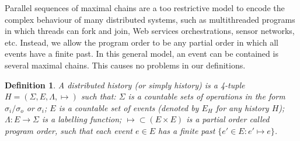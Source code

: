 \documentclass[9pt,numbers]{sigplanconf}
\newtheorem{definition}{Definition}
\begin{document}
Parallel sequences of maximal chains are a too restrictive model to encode the complex behaviour of many distributed systems,
such as multithreaded programs in which threads can fork and join, Web services orchestrations, sensor networks, etc.
Instead, we allow the program order to be any partial order in which all events have a finite past.
In this general model, an event can be contained is several maximal chains. This causes no problems in our definitions.  

\begin{definition}
  A distributed history (or simply history) is a 4-tuple $H = (\Sigma, E, \Lambda, \mapsto)$ such that:
 $\Sigma$ is a countable sets of \emph{operations} in the form $\sigma_i/\sigma_o$ or $\sigma_i$;
 $E$ is a countable set of \emph{events} (denoted by $E_H$ for any history $H$);
 $\Lambda : E \rightarrow \Sigma$ is a \emph{labelling function};
 ${\mapsto} \subset {(E\times E)}$ is a partial order called \emph{program order}, such that
  each event $e\in E$ has a finite past $\{e'\in E : e' \mapsto e\}$. 
\end{definition}
\end{document}
